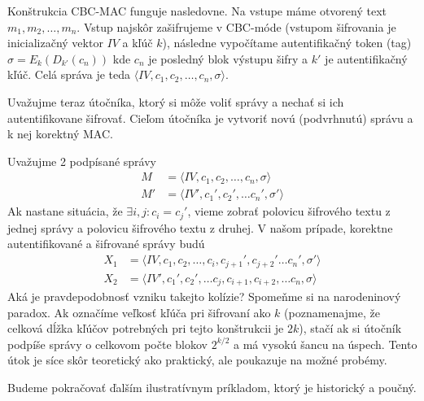 \begin{priklad}
    Konštrukcia CBC-MAC funguje nasledovne. Na vstupe máme otvorený
    text $m_1,m_2,\dots,m_n$. Vstup najskôr zašifrujeme v CBC-móde
    (vstupom šifrovania je inicializačný vektor $IV$ a kľúč $k$),
    následne vypočítame autentifikačný token (tag)
    $\sigma=E_k(D_{k'}(c_n))$ kde $c_n$ je posledný blok výstupu
    šifry a $k'$ je autentifikačný kľúč.
    Celá správa je teda $\langle IV, c_1, c_2,\dots,c_n,\sigma
    \rangle$.

    Uvažujme teraz útočníka, ktorý si môže voliť správy a nechať si
    ich autentifikovane šifrovať. Cieľom útočníka je vytvoriť novú
    (podvrhnutú) správu a k nej korektný MAC.

    Uvažujme 2 podpísané správy
    \begin{align*}
        M &= \langle IV, c_1, c_2, \dots, c_n, \sigma \rangle \\
        M' &= \langle IV', c_1', c_2', \dots c_n', \sigma' \rangle
    \end{align*}
    Ak nastane situácia, že $\exists i,j: c_i = c_j'$, vieme zobrať
    polovicu šifrového textu z jednej správy a polovicu šifrového
    textu z druhej. V našom prípade, korektne autentifikované a
    šifrované správy budú
    \begin{align*}
        X_1 &= \langle IV, c_1, c_2, \dots, c_i, c_{j+1}', c_{j+2}' \dots
                c_n', \sigma' \rangle \\
        X_2 &= \langle IV', c_1', c_2', \dots c_j,
           c_{i+1}, c_{i+2}, \dots c_n, \sigma \rangle
    \end{align*}
    Aká je pravdepodobnosť vzniku takejto kolízie? Spomeňme si na
    narodeninový paradox. Ak označíme veľkosť kľúča pri šifrovaní ako 
    $k$ (poznamenajme, že celková dĺžka kľúčov potrebných pri tejto
    konštrukcii je $2k$),
    stačí ak si útočník podpíše správy o celkovom počte blokov
    $2^{k/2}$ a má vysokú šancu na úspech. Tento útok je síce skôr
    teoretický ako praktický, ale poukazuje na možné probémy.
\end{priklad}

Budeme pokračovať ďalším ilustratívnym príkladom, ktorý je historický
a poučný.

